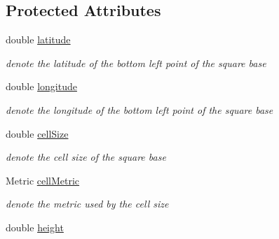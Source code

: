 \subsection*{\-Protected \-Attributes}
\begin{DoxyCompactItemize}
\item 
\hypertarget{classBaseBlock_ac403932018af3cc6a113a9591709ed01}{double \hyperlink{classBaseBlock_ac403932018af3cc6a113a9591709ed01}{latitude}}\label{classBaseBlock_ac403932018af3cc6a113a9591709ed01}

\begin{DoxyCompactList}\small\item\em denote the latitude of the bottom left point of the square base \end{DoxyCompactList}\item 
\hypertarget{classBaseBlock_a27fbc0dbe7f9cd0e482d8f146765ec96}{double \hyperlink{classBaseBlock_a27fbc0dbe7f9cd0e482d8f146765ec96}{longitude}}\label{classBaseBlock_a27fbc0dbe7f9cd0e482d8f146765ec96}

\begin{DoxyCompactList}\small\item\em denote the longitude of the bottom left point of the square base \end{DoxyCompactList}\item 
\hypertarget{classBaseBlock_a1b9c700752eac2b075004711e8534735}{double \hyperlink{classBaseBlock_a1b9c700752eac2b075004711e8534735}{cell\-Size}}\label{classBaseBlock_a1b9c700752eac2b075004711e8534735}

\begin{DoxyCompactList}\small\item\em denote the cell size of the square base \end{DoxyCompactList}\item 
\hypertarget{classBaseBlock_a367de5ddec6ab1fbc4e4f39ee51f44de}{\-Metric \hyperlink{classBaseBlock_a367de5ddec6ab1fbc4e4f39ee51f44de}{cell\-Metric}}\label{classBaseBlock_a367de5ddec6ab1fbc4e4f39ee51f44de}

\begin{DoxyCompactList}\small\item\em denote the metric used by the cell size \end{DoxyCompactList}\item 
\hypertarget{classBaseBlock_ae796765729a25191c1c6376a92bdf282}{double \hyperlink{classBaseBlock_ae796765729a25191c1c6376a92bdf282}{height}}\label{classBaseBlock_ae796765729a25191c1c6376a92bdf282}


\end{DoxyCompactItemize}
